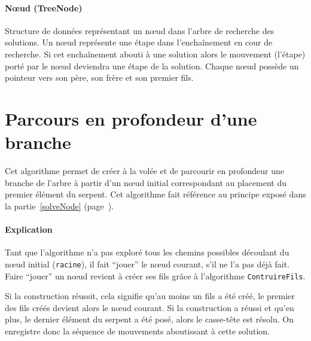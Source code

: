 \paragraph{Nœud (TreeNode)} Structure de données représentant un nœud dans l'arbre de recherche des solutions. Un nœud représente une étape dans l'enchaînement en cour de recherche. Si cet enchaînement abouti à une solution alors le mouvement (l'étape) porté par le nœud deviendra une étape de la solution.
Chaque nœud possède un pointeur vers son père, son frère et son premier fils.

\section{Parcours en profondeur d'une branche}
Cet algorithme permet de créer à la volée et de parcourir en profondeur une branche de l'arbre à partir d'un nœud initial correspondant au placement du premier élément du serpent. Cet algorithme fait référence au principe exposé dans la partie~\ref{solveNode} (page~\pageref{solveNode}).

\begin{algo}
 \VAR
 \ENDVAR
 \BEGIN
 \ENDIF
 \ELSE
 \ELSE
 \ENDIF
 \ENDIF
 \ENDWHILE
 \END
\end{algo}

\newpage
\paragraph{Explication}
Tant que l'algorithme n'a pas exploré tous les chemins possibles découlant du nœud initial (\verb|racine|), il fait ``jouer'' le nœud courant, s'il ne l'a pas déjà fait. Faire ``jouer'' un nœud revient à créer ses fils grâce à l'algorithme \verb|ContruireFils|.

Si la construction réussit, cela signifie qu'au moins un fils a été créé, le premier des fils créés devient alors le nœud courant. Si la construction a réussi et qu'en plus, le dernier élément du serpent a été posé, alors le casse-tête est résolu. On enregistre donc la séquence de mouvements aboutissant à cette solution. 

